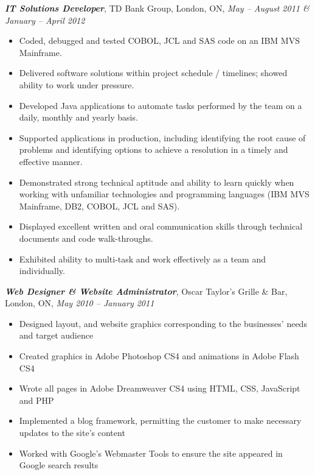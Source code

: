 \documentclass[10pt,letterpaper]{article}
\newcommand{\job}[4]
{
    \emph{\textbf{#1}}, #2, #3, \emph{#4}
}
\begin{document}
\vspace{0.5em}
\job{IT Solutions Developer}{TD Bank Group}{London, ON}{May -- August 2011 \& January -- April 2012}\\
\begin{adjustwidth}{0.1in}{0.5in}
    \begin{itemize}
	\item Coded, debugged and tested COBOL, JCL and SAS code on an IBM MVS Mainframe.
	\item Delivered software solutions within project schedule / timelines; showed ability to work under pressure.
	\item Developed Java applications to automate tasks performed by the team on a daily, monthly and yearly basis.
	\item Supported applications in production, including identifying the root cause of problems and identifying 
	    options to achieve a resolution in a timely and effective manner.
	\item Demonstrated strong technical aptitude and ability to learn quickly when working with unfamiliar 
	    technologies and programming languages (IBM MVS Mainframe, DB2, COBOL, JCL and SAS).
	\item Displayed excellent written and oral communication skills through technical documents and code 
	    walk-throughs.
	\item Exhibited ability to multi-task and work effectively as a team and individually.
    \end{itemize}
\end{adjustwidth}
\vspace{0.5em}
\job{Web Designer \& Website Administrator}{Oscar Taylor's Grille \& Bar}{London, ON}{May 2010 -- January 2011}\\
\begin{adjustwidth}{0.1in}{0.5in}
    \begin{itemize}
	\item Designed layout, and website graphics corresponding to the businesses’ needs and target audience
	\item Created graphics in Adobe Photoshop CS4 and animations in Adobe Flash CS4
	\item Wrote all pages in Adobe Dreamweaver CS4 using HTML, CSS, JavaScript and PHP
	\item Implemented a blog framework, permitting the customer to make necessary updates to the site’s content
	\item Worked with Google’s Webmaster Tools to ensure the site appeared in Google search results
    \end{itemize}
\end{adjustwidth}
\end{document}
